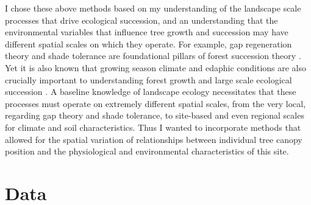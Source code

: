 \documentclass[12pt,a4paper]{article}
\begin{document}
I chose these above methods based on my understanding of the landscape scale processes that drive ecological succession, and an understanding that the environmental variables that influence tree growth and succession may have different spatial scales on which they operate.  For example, gap regeneration theory and shade tolerance are foundational pillars of forest succession theory \citep{runkle1981gap,shugart1984theory,yamamoto1992gap}.  Yet it is also known that growing season climate and edaphic conditions are also crucially important to understanding forest growth and large scale ecological succession \citep{west2012forest}.  A baseline knowledge of landscape ecology necessitates that these processes must operate on extremely different spatial scales, from the very local, regarding gap theory and shade tolerance, to site-based and even regional scales for climate and soil characteristics.  Thus I wanted to incorporate methods that allowed for the spatial variation of relationships between individual tree canopy position and the physiological and environmental characteristics of this site.


\section{Data}\label{data}
\end{document}
